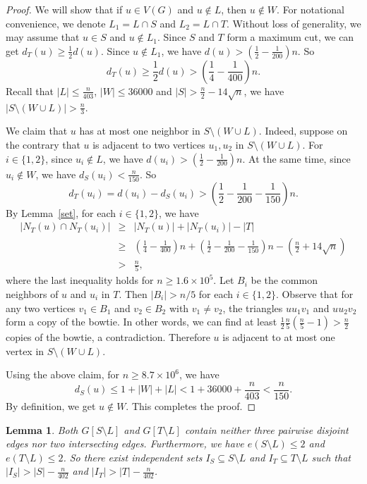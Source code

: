 \documentclass[11pt]{article}
\newtheorem{lemma}[theorem]{Lemma}
\begin{document}
  \begin{proof}
We will show that if $u\in V(G)$ and $u\notin L$, then $u\notin W$. 
For notational convenience, we denote $L_1=L\cap S$ and $L_2=L\cap T$. Without loss of generality, 
we may assume that $u\in S$ and 
   $u\notin L_1.$ Since  $S$ and $T$ form a maximum cut, 
  we can get  $d_T(u)\ge \frac{1}{2}d(u)$. Since $u\not\in L_1$, we have $d(u)> \left(\frac{1}{2}-\frac{1}{200} \right)n$. So
   $$d_T(u)\ge \frac{1}{2}d(u) > 
   \left(\frac{1}{4}-\frac{1}{400} \right)n.$$
       Recall that 
  $|L|\le \frac{n}{403}$, $|W| \le 36000$ and 
  $|S|> \frac{n}{2} - 14\sqrt{n} $,   
we have 
$  |S\setminus (W\cup L)| > \frac{n}{3}$. 

  We claim that $u$ has at most one neighbor in 
  $S\setminus (W\cup L)$. 
  Indeed, suppose on the contrary that 
   $u$ is adjacent to two vertices  $u_1, u_2$ in $S\setminus (W\cup L)$.  
   For $i\in \{1,2\}$, since $u_i\not\in L$,  we have $d(u_i)> \left(\frac{1}{2}-\frac{1}{200}\right )n$. At the same time, since $u_i\notin W$, 
   we have $d_S(u_i)< \frac{n}{150}$. So
  \[  d_T(u_i)=d(u_i)-d_S(u_i)> \left(\frac{1}{2}-\frac{1}{200} - \frac{1}{150} \right)n. \] 
   By Lemma~\ref{set}, for each $i \in \{1,2\}$, 
   we have
   \begin{eqnarray*}
 |N_T(u)\cap N_T(u_i)| 
 &\ge&  |N_T(u) | + |N_T(u_i) |  -|T| \\
& \ge &\left (\frac{1}{4}-\frac{1}{400}\right)n+\left(\frac{1}{2}-\frac{1}{200} -\frac{1}{150} \right)n 
- \left( \frac{n}{2} + 14 \sqrt{n} \right)\\
 &>&\frac{n}{5}, 
\end{eqnarray*}
 where the last inequality holds for $n\ge 1.6\times 10^5$.   
Let $B_i$ be the common neighbors of $u$ 
and $u_i$ in $T$. 
Then $|B_i|>n/5$ for each $i\in \{1,2\}$. 
Observe that for any two vertices $v_1\in B_1$ and 
 $v_2\in B_2$ with $v_1\neq v_2$, 
the triangles $uu_1v_1$ and $uu_2v_2$ 
form a copy of the bowtie. 
In other words, we can find at least 
$\frac{1}{2}\frac{n}{5}(\frac{n}{5} -1) > \frac{n}{2}$ copies of the bowtie, a contradiction. 
Therefore $u$ is adjacent to at most one vertex in  $S\setminus (W\cup L)$.

Using the above claim, for $n\ge 8.7\times 10^{6}$, we have 
\[  d_S(u) \le 1+ |W| +|L| 
<  1+ 36000 + \frac{n}{403} < \frac{n}{150}. \] 
By definition, we get $u\notin W$.
This completes the proof. 
 \end{proof}




\begin{lemma}  \label{lem-one-edge}
Both $G[S\setminus L]$ and $G[T\setminus L] $ 
 contain neither three pairwise disjoint edges nor two intersecting edges.   
Furthermore, 
we have $e(S\setminus L) \le 2$ and 
$e(T\setminus L) \le 2$. So 
there exist independent sets
 $I_S\subseteq S\setminus L$  and $I_T\subseteq T\setminus L$ such that
$ |I_S|>  |S|- \frac{n}{402} $ and $|I_T|> |T|- \frac{n}{402} $. 
 \end{lemma}
\end{document}
